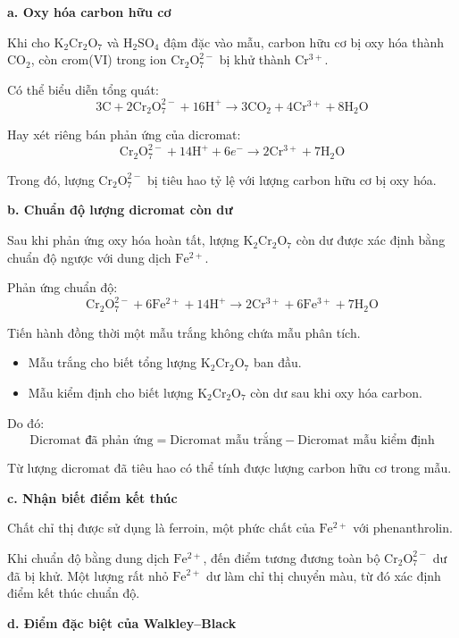 \noindent\textbf{a. Oxy hóa carbon hữu cơ}

Khi cho \(\mathrm{K_2Cr_2O_7}\) và \(\mathrm{H_2SO_4}\) đậm đặc vào mẫu, carbon hữu cơ bị oxy hóa thành \(\mathrm{CO_2}\), còn crom(VI) trong ion \(\mathrm{Cr_2O_7^{2-}}\) bị khử thành \(\mathrm{Cr^{3+}}\).

Có thể biểu diễn tổng quát:
\[
  3\mathrm{C} + 2\mathrm{Cr_2O_7^{2-}} + 16\mathrm{H^+}
  \longrightarrow 3\mathrm{CO_2} + 4\mathrm{Cr^{3+}} + 8\mathrm{H_2O}
\]

Hay xét riêng bán phản ứng của dicromat:
\[
  \mathrm{Cr_2O_7^{2-}} + 14\mathrm{H^+} + 6e^-
  \longrightarrow 2\mathrm{Cr^{3+}} + 7\mathrm{H_2O}
\]

Trong đó, lượng \(\mathrm{Cr_2O_7^{2-}}\) bị tiêu hao tỷ lệ với lượng carbon hữu cơ bị oxy hóa.

\noindent\textbf{b. Chuẩn độ lượng dicromat còn dư}

Sau khi phản ứng oxy hóa hoàn tất, lượng \(\mathrm{K_2Cr_2O_7}\) còn dư được xác định bằng chuẩn độ ngược với dung dịch \(\mathrm{Fe^{2+}}\).

Phản ứng chuẩn độ:
\[
  \mathrm{Cr_2O_7^{2-}} + 6\mathrm{Fe^{2+}} + 14\mathrm{H^+}
  \longrightarrow 2\mathrm{Cr^{3+}} + 6\mathrm{Fe^{3+}} + 7\mathrm{H_2O}
\]

Tiến hành đồng thời một mẫu trắng không chứa mẫu phân tích.
\begin{itemize}
  \item Mẫu trắng cho biết tổng lượng \(\mathrm{K_2Cr_2O_7}\) ban đầu.
  \item Mẫu kiểm định cho biết lượng \(\mathrm{K_2Cr_2O_7}\) còn dư sau khi oxy hóa carbon.
\end{itemize}

Do đó:
\[
  \boxed{\text{Dicromat đã phản ứng} = \text{Dicromat mẫu trắng} - \text{Dicromat mẫu kiểm định}}
\]

Từ lượng dicromat đã tiêu hao có thể tính được lượng carbon hữu cơ trong mẫu.

\noindent\textbf{c. Nhận biết điểm kết thúc}

Chất chỉ thị được sử dụng là ferroin, một phức chất của \(\mathrm{Fe^{2+}}\) với phenanthrolin.

Khi chuẩn độ bằng dung dịch \(\mathrm{Fe^{2+}}\), đến điểm tương đương toàn bộ \(\mathrm{Cr_2O_7^{2-}}\) dư đã bị khử.
Một lượng rất nhỏ \(\mathrm{Fe^{2+}}\) dư làm chỉ thị chuyển màu, từ đó xác định điểm kết thúc chuẩn độ.

\noindent\textbf{d. Điểm đặc biệt của Walkley--Black}

